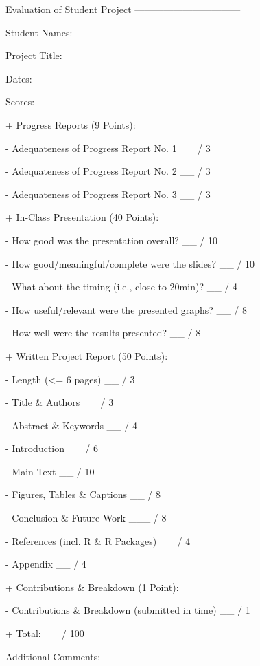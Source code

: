 Evaluation of Student Project
---------------------------------

Student Names:              

Project Title:  

Dates: 


Scores:
-------

+ Progress Reports (9 Points): 

    - Adequateness of Progress Report No. 1
          __ / 3

    - Adequateness of Progress Report No. 2
          __ / 3
          
    - Adequateness of Progress Report No. 3
          __ / 3
      
          
+ In-Class Presentation (40 Points): 

    - How good was the presentation overall?                          
      __ / 10

    - How good/meaningful/complete were the slides?                          
      __ / 10
      
    - What about the timing (i.e., close to 20min)?           
      __ / 4
  
    - How useful/relevant were the presented graphs?                                   
      __ / 8
      
    - How well were the results presented?                   
      __ / 8


+ Written Project Report (50 Points): 

   - Length (<= 6 pages)
     __ / 3
     
   - Title & Authors
     __ / 3
      
   - Abstract & Keywords
     __ / 4
        
   - Introduction
     __ / 6
      
   - Main Text
     __ / 10
                
   - Figures, Tables & Captions
     __ / 8
     
   - Conclusion & Future Work
     ___ / 8

   - References (incl. R & R Packages)
     __ / 4
        
   - Appendix
     __ / 4
        
        
+ Contributions & Breakdown (1 Point): 

   - Contributions & Breakdown (submitted in time)
     __ / 1


+ Total:
     __ / 100 


Additional Comments:
--------------------
